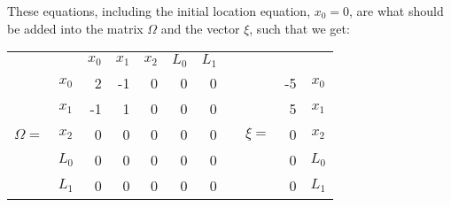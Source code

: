\noindent These equations, including the initial location equation, $x_0 = 0$,  are what should be added into the matrix $\Omega$ and the vector $\xi$, such that we get:
\begin{table}[!h]
    \centering
\begin{tabular}{cc|rrrrr c crc}
          &       & $x_0$ & $x_1$ & $x_2$ & $L_0$ & $L_1$ & 
          
          \qquad &        &                        & \\
          
          \cline{2-7}
          & $x_0$ &   2   &  -1   &  0    &  0    &   0   &  
          
                 &        &\multicolumn{1}{r|}{-5} & $x_0$\\
          
          & $x_1$ &  -1   &   1   &  0    &  0    &   0   &  
                 
                 &        & \multicolumn{1}{r|}{5} & $x_1$\\

$\Omega=$ & $x_2$ &   0   &   0   &  0    &  0    &   0   &  
                 
                 & $\xi=$ &\multicolumn{1}{r|}{0} & $x_2$\\
                 
          & $L_0$ &   0   &   0   &  0    &  0    &   0   &  
                 
                 &        & \multicolumn{1}{r|}{0} & $L_0$\\
                 
          & $L_1$ &   0   &   0   &  0    &  0    &   0   &  
          
                 &        & \multicolumn{1}{r|}{0} & $L_1$\\
\end{tabular}                                               
\end{table}

